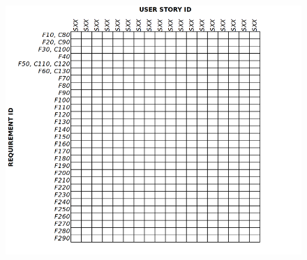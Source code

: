 \documentclass[a4paper,10pt]{article}
\begin{document}
\begin{figure}[h]
\includegraphics[width=\textwidth]{coverage_matrix}
\centering
\end{figure}

\newpage

\end{document}
